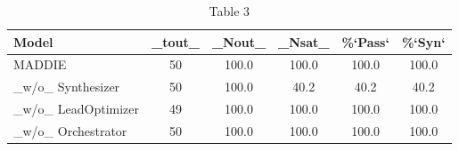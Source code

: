 \begin{table}[t]
\centering
\caption{Table 3}
\label{tab:2610.16975}
\begin{tabular}{lccccc}
\toprule
Model & \_tout\_ & \_Nout\_ & \_Nsat\_ & \%`Pass` & \%`Syn` \\
\midrule
MADDIE & 50 & 100.0 & 100.0 & 100.0 & 100.0 \\
\_w/o\_ Synthesizer & 50 & 100.0 & 40.2 & 40.2 & 40.2 \\
\_w/o\_ LeadOptimizer & 49 & 100.0 & 100.0 & 100.0 & 100.0 \\
\_w/o\_ Orchestrator & 50 & 100.0 & 100.0 & 100.0 & 100.0 \\
\bottomrule
\end{tabular}
\end{table}
